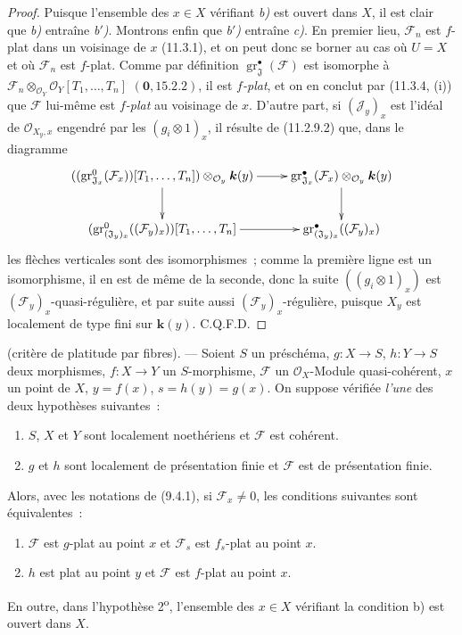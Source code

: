 \begin{proof}
Puisque l'ensemble des $x\in X$ vérifiant \emph{b)} est ouvert dans $X$, il est clair
que \emph{b)} entraîne \emph{b$'$)}. Montrons enfin que \emph{b$'$)} entraîne \emph{c)}. En premier lieu,
$\mathcal F_n$ est $f$-plat dans un voisinage de $x$ (11.3.1), et on peut donc
se borner au cas où $U=X$ et où $\mathcal F_n$ est $f$-plat. Comme par
définition $\operatorname{gr}_{\mathfrak J}^\bullet(\mathcal F)$ est isomorphe à
$\mathcal F_n\otimes_{\mathcal O_Y}\mathcal O_Y[T_1,\ldots,T_n]$
$(\mathbf 0,15.2.2)$, il est \emph{$f$-plat}, et on en conclut par (11.3.4, (i)) que
$\mathcal F$ lui-même est \emph{$f$-plat} au voisinage de $x$. D'autre part, si
$(\mathcal J_y)_x$ est l'idéal de $\mathcal O_{X_y,x}$ engendré par les
$(g_i\otimes1)_x$, il résulte de (11.2.9.2) que, dans le diagramme
\[
\xymatrix{
((\operatorname{gr}_{\mathfrak J_x}^0(\mathcal F_x))[T_1,\ldots,T_n])
 \otimes_{\mathcal O_y}\boldsymbol{k}(y) \ar[r] \ar[d] &
\operatorname{gr}_{\mathfrak J_x}^\bullet(\mathcal F_x)
 \otimes_{\mathcal O_y}\boldsymbol{k}(y) \ar[d] \\
(\operatorname{gr}_{(\mathfrak J_y)_x}^0((\mathcal F_y)_x))
 [T_1,\ldots,T_n] \ar[r] &
\operatorname{gr}_{(\mathfrak J_y)_x}^\bullet((\mathcal F_y)_x)
}
\]
les flèches verticales sont des isomorphismes~; comme la première ligne est un
isomorphisme, il en est de même de la seconde, donc la suite
$((g_i\otimes1)_x)$ est $(\mathcal F_y)_x$-quasi-régulière, et par suite aussi
$(\mathcal F_y)_x$-régulière, puisque $X_y$ est localement de type fini sur
$\boldsymbol{k}(y)$. C.Q.F.D.
\end{proof}

\begin{theorem}[11.3.10]
(critère de platitude par fibres). --- Soient $S$ un préschéma,
$g:X\to S$, $h:Y\to S$ deux morphismes, $f:X\to Y$ un $S$-morphisme,
$\mathcal F$ un $\mathcal O_X$-Module quasi-cohérent, $x$ un point de $X$,
$y=f(x)$, $s=h(y)=g(x)$. On suppose vérifiée \emph{l'une} des deux hypothèses
suivantes~:
\begin{enumerate}[label=\textup{\arabic{enumi}\textsuperscript{o}}]
\item $S$, $X$ et $Y$ sont localement noethériens et $\mathcal F$ est cohérent.
\item $g$ et $h$ sont localement de présentation finie et $\mathcal F$ est de
présentation finie.
\end{enumerate}
Alors, avec les notations de \textup{(9.4.1)}, si $\mathcal F_x\neq0$, les conditions
suivantes sont équivalentes~:
\begin{enumerate}[label=\emph{\alph*)}]
\item $\mathcal F$ est $g$-plat au point $x$ et $\mathcal F_s$ est $f_s$-plat
au point $x$.
\item $h$ est plat au point $y$ et $\mathcal F$ est $f$-plat au point $x$.
\end{enumerate}
En outre, dans l'hypothèse \textup{2\textsuperscript{o}}, l'ensemble des $x\in X$
vérifiant la condition \textup{b)} est ouvert dans $X$.
\end{theorem}

